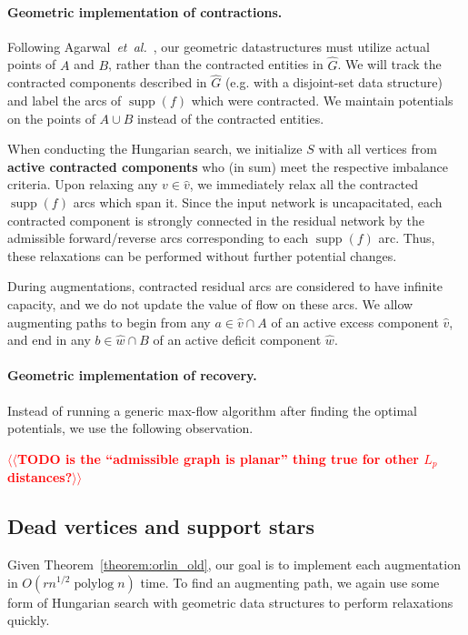\documentclass[11pt]{article}
\makeatletter
\def\etal{\textit{et~al.}}
\def\polylog{\mathop{\mathrm{polylog}}}
\def\supp{\operatorname{supp}}
\theoremstyle{plain}
\numberwithin{figure}{section}
\def\EMPH#1{\textbf{\boldmath #1}}
\def\n@te#1{\textsf{\boldmath \textbf{$\langle\!\langle$#1$\rangle\!\rangle$}}\leavevmode}
\def\note#1{\textcolor{red}{\n@te{#1}}}
\makeatother
\begin{document}
\paragraph{Geometric implementation of contractions.}
Following Agarwal~\etal~\cite{AFPVX17}, our geometric datastructures must
utilize actual points of $A$ and $B$, rather than the contracted entities in
$\hat{G}$.
We will track the contracted components described in $\hat{G}$ (e.g. with a
disjoint-set data structure) and label the arcs of $\supp(f)$ which were
contracted.
We maintain potentials on the points of $A \cup B$ instead of the contracted
entities.

When conducting the Hungarian search, we initialize $S$ with all vertices from
\EMPH{active contracted components} who (in sum) meet the respective imbalance
criteria.
Upon relaxing any $v \in \hat{v}$, we immediately relax all the contracted
$\supp(f)$ arcs which span it.
Since the input network is uncapacitated, each contracted component is
strongly connected in the residual network by the admissible forward/reverse
arcs corresponding to each $\supp(f)$ arc.
Thus, these relaxations can be performed without further potential changes.

During augmentations, contracted residual arcs are considered to have infinite
capacity, and we do not update the value of flow on these arcs.
We allow augmenting paths to begin from any $a \in \hat{v} \cap A$ of an active
excess component $\hat{v}$, and end in any $b \in \hat{w} \cap B$ of an active
deficit component $\hat{w}$.

\paragraph{Geometric implementation of recovery.}
Instead of running a generic max-flow algorithm after finding the optimal
potentials, we use the following observation.

\note{TODO is the ``admissible graph is planar'' thing true for other $L_p$ distances?} %

\subsection{Dead vertices and support stars}

Given Theorem~\ref{theorem:orlin_old}, our goal is to implement each
augmentation in $O(rn^{1/2}\polylog n)$ time.
To find an augmenting path, we again use some form of Hungarian search with
geometric data structures to perform relaxations quickly.
\end{document}
